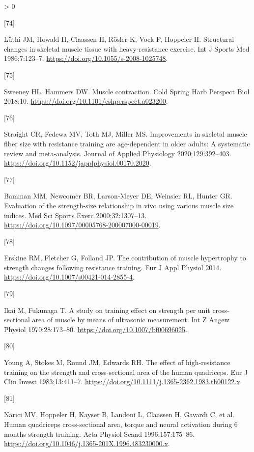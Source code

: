 \documentclass[twoside,10pt]{gihclass} %
\newlength{\cslhangindent}
\newlength{\csllabelwidth}
\newenvironment{CSLReferences}[3] %
 {%
  \setlength{\parindent}{0pt}
  \ifodd #1 \everypar{\setlength{\hangindent}{\cslhangindent}}\ignorespaces\fi
  \ifnum #2 > 0
  \setlength{\parskip}{#2\baselineskip}
  \fi
 }%
 {}
\newcommand{\CSLLeftMargin}[1]{\parbox[t]{\maxof{\widthof{#1}}{\csllabelwidth}}{#1}}
\newcommand{\CSLRightInline}[1]{\parbox[t]{\linewidth}{#1}}
\begin{document}
\begin{CSLReferences}{0}{0}
\leavevmode\hypertarget{ref-RN2731}{}%
\CSLLeftMargin{{[}74{]} }
\CSLRightInline{Lüthi JM, Howald H, Claassen H, Rösler K, Vock P, Hoppeler H. Structural changes in skeletal muscle tissue with heavy-resistance exercise. Int J Sports Med 1986;7:123--7. \url{https://doi.org/10.1055/s-2008-1025748}.}

\leavevmode\hypertarget{ref-RN2756}{}%
\CSLLeftMargin{{[}75{]} }
\CSLRightInline{Sweeney HL, Hammers DW. Muscle contraction. Cold Spring Harb Perspect Biol 2018;10. \url{https://doi.org/10.1101/cshperspect.a023200}.}

\leavevmode\hypertarget{ref-RN2669}{}%
\CSLLeftMargin{{[}76{]} }
\CSLRightInline{Straight CR, Fedewa MV, Toth MJ, Miller MS. Improvements in skeletal muscle fiber size with resistance training are age-dependent in older adults: A systematic review and meta-analysis. Journal of Applied Physiology 2020;129:392--403. \url{https://doi.org/10.1152/japplphysiol.00170.2020}.}

\leavevmode\hypertarget{ref-RN2758}{}%
\CSLLeftMargin{{[}77{]} }
\CSLRightInline{Bamman MM, Newcomer BR, Larson-Meyer DE, Weinsier RL, Hunter GR. Evaluation of the strength-size relationship in vivo using various muscle size indices. Med Sci Sports Exerc 2000;32:1307--13. \url{https://doi.org/10.1097/00005768-200007000-00019}.}

\leavevmode\hypertarget{ref-RN1142}{}%
\CSLLeftMargin{{[}78{]} }
\CSLRightInline{Erskine RM, Fletcher G, Folland JP. The contribution of muscle hypertrophy to strength changes following resistance training. Eur J Appl Physiol 2014. \url{https://doi.org/10.1007/s00421-014-2855-4}.}

\leavevmode\hypertarget{ref-RN2629}{}%
\CSLLeftMargin{{[}79{]} }
\CSLRightInline{Ikai M, Fukunaga T. A study on training effect on strength per unit cross-sectional area of muscle by means of ultrasonic measurement. Int Z Angew Physiol 1970;28:173--80. \url{https://doi.org/10.1007/bf00696025}.}

\leavevmode\hypertarget{ref-RN2737}{}%
\CSLLeftMargin{{[}80{]} }
\CSLRightInline{Young A, Stokes M, Round JM, Edwards RH. The effect of high-resistance training on the strength and cross-sectional area of the human quadriceps. Eur J Clin Invest 1983;13:411--7. \url{https://doi.org/10.1111/j.1365-2362.1983.tb00122.x}.}

\leavevmode\hypertarget{ref-RN2735}{}%
\CSLLeftMargin{{[}81{]} }
\CSLRightInline{Narici MV, Hoppeler H, Kayser B, Landoni L, Claassen H, Gavardi C, et al. Human quadriceps cross-sectional area, torque and neural activation during 6 months strength training. Acta Physiol Scand 1996;157:175--86. \url{https://doi.org/10.1046/j.1365-201X.1996.483230000.x}.}


\end{CSLReferences}
\end{document}
